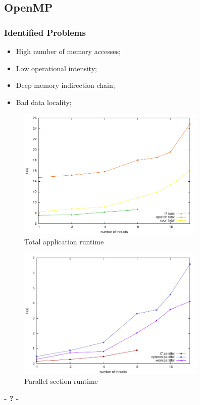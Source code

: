 \documentclass{beamer}
\begin{document}
\subsection{OpenMP}

\begin{frame}
	\frametitle{Identified Problems}
	\begin{itemize}
	\item High number of memory accesses;
	\item Low operational intensity;
	\item Deep memory indirection chain;
	\item Bad data locality;
	\end{itemize}
\end{frame}

\begin{frame}	
	\begin{center}

	\begin{figure}[!htp]
		\includegraphics[width=9cm]{../images/total.pdf}
		\caption{Total application runtime}
		\label{fig:roofline}
	\end{figure}
	\end{center}
\end{frame}

\begin{frame}
	\begin{center}
	\begin{figure}[!htp]
		\includegraphics[width=9cm]{../images/parallel.pdf}
		\caption{Parallel section runtime}
		\label{fig:roofline}
	\end{figure}
	\end{center}
\end{frame}

\begin{frame}
\titlepage
	\begin{center}
		\Huge\bfseries
		- ? -
	\end{center}
\end{frame}
\end{document}
